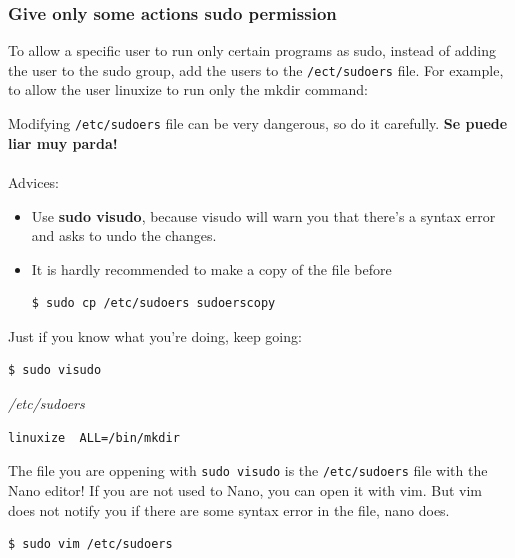 \documentclass{article}
\newenvironment{blocktemplate}[1]{%
    \tcolorbox[beamer,%
    noparskip,breakable,
    colframe=Blue,%
    colbacklower=LimeGreen!75!LightGreen,%
    title=#1]}%
    {\endtcolorbox}
\newenvironment{blocktemplateIII}[1]{%
    \tcolorbox[beamer,%
    noparskip,breakable,
    ,colframe=Red,%
    colbacklower=LimeGreen!75!LightGreen,%
    title=#1]}%
    {\endtcolorbox}
\newenvironment{codetemplate}[1][]{%
  \mybasecolorbox[#1]
  \itshape
}{%
  \endmybasecolorbox
}
\begin{document}
\subsubsection{Give only some actions sudo permission}
To allow a specific user to run only certain programs as sudo, instead of adding the user to the sudo group, add the users to the \verb|/ect/sudoers| file. For example, to allow the user linuxize to run only the mkdir command:

\begin{blocktemplateIII}{WARNING}
Modifying \verb|/etc/sudoers| file can be very dangerous, so do it carefully. \textbf{Se puede liar muy parda!}
\\\\
Advices:
\begin{itemize}
    \item Use \textbf{sudo visudo}, because visudo will warn you that there’s a syntax error and asks to undo the changes.
    \item It is hardly recommended to make a copy of the file before
\begin{codetemplate}{}
\begin{verbatim}
$ sudo cp /etc/sudoers sudoerscopy
\end{verbatim}
\end{codetemplate}
\end{itemize}
\end{blocktemplateIII}
Just if you  know what you're doing, keep going:
\begin{codetemplate}{}
\begin{verbatim}
$ sudo visudo
\end{verbatim}
\end{codetemplate}

\begin{codetemplate}{/etc/sudoers}
\begin{verbatim}
linuxize  ALL=/bin/mkdir
\end{verbatim}
\end{codetemplate}

\begin{blocktemplate}{NOTE}
The file you are oppening with \verb|sudo visudo| is the \verb|/etc/sudoers| file with the Nano editor! If you are not used to Nano, you can open it with vim. But vim does not notify you if there are some syntax error in the file, nano does.
\begin{codetemplate}{}
\begin{verbatim}
$ sudo vim /etc/sudoers
\end{verbatim}
\end{codetemplate}
\end{blocktemplate}
\end{document}

